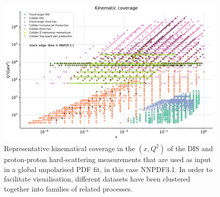 \begin{figure}[t]
\begin{center}
  \includegraphics[scale=0.60]{plots/kinplot-report.pdf}
  \caption{\small Representative kinematical coverage in the
    $(x,Q^2)$ of the DIS and proton-proton hard-scattering measurements that are
    used as input in a global unpolarised PDF fit, in this case NNPDF3.1.
    In order to facilitate visualisation, different
    datasets have been clustered together into families of
    related processes.
    \label{fig:kinplot-report} 
  }
\end{center}
\end{figure}

